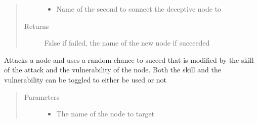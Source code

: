 \documentclass[letterpaper,10pt,english]{sphinxmanual}
\begin{document}
\begin{fulllineitems}
\begin{fulllineitems}
\begin{quote}
\begin{description}
\begin{itemize}
\item {}
\sphinxAtStartPar
{} \textendash{} Name of the second to connect the deceptive node to

\end{itemize}

\item[{Returns}] \leavevmode
\sphinxAtStartPar
False if failed, the name of the new node if succeeded

\end{description}\end{quote}

\end{fulllineitems}


\begin{fulllineitems}
\label{\detokenize{source/yawning_titan.envs.generic.core:yawning_titan.envs.generic.core.network_interface.NetworkInterface.attack_node}}
\sphinxAtStartPar
Attacks a node and uses a random chance to suceed that is modified by the skill of the attack and the
vulnerability of the node. Both the skill and the vulnerability can be toggled to either be used or not
\begin{quote}\begin{description}
\item[{Parameters}] \leavevmode\begin{itemize}
\item {}
\sphinxAtStartPar
{} \textendash{} The name of the node to target


\end{itemize}
\end{description}
\end{quote}
\end{fulllineitems}
\end{fulllineitems}
\end{document}
